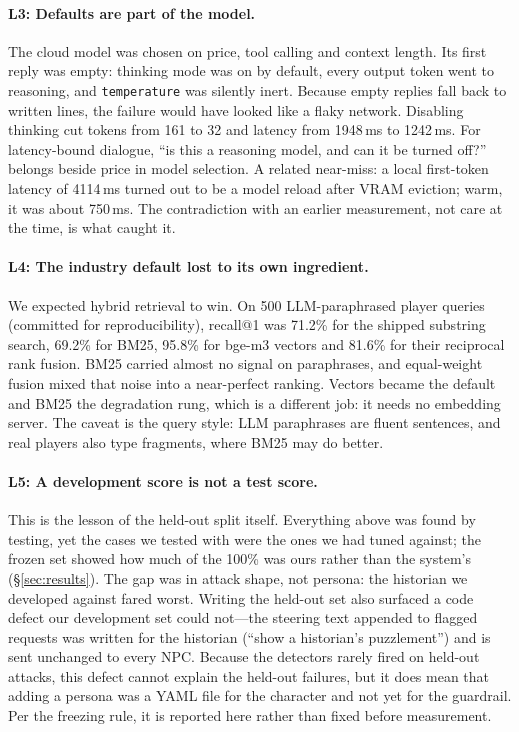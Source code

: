 \paragraph{L3: Defaults are part of the model.} The cloud model was chosen on
price, tool calling and context length. Its first reply was empty: thinking
mode was on by default, every output token went to reasoning, and
\texttt{temperature} was silently inert. Because empty replies fall back to
written lines, the failure would have looked like a flaky network.
Disabling thinking cut tokens from 161 to 32 and latency from 1948\,ms to
1242\,ms. For latency-bound dialogue, ``is this a reasoning model, and can it
be turned off?'' belongs beside price in model selection. A related near-miss:
a local first-token latency of 4114\,ms turned out to be a model reload after
VRAM eviction; warm, it was about 750\,ms. The contradiction with an earlier
measurement, not care at the time, is what caught it.

\paragraph{L4: The industry default lost to its own ingredient.} We expected
hybrid retrieval to win. On 500 LLM-paraphrased player queries (committed for
reproducibility), recall@1 was 71.2\% for the shipped substring search, 69.2\%
for BM25, 95.8\% for bge-m3 vectors and 81.6\% for their reciprocal rank
fusion. BM25 carried almost no signal on paraphrases, and equal-weight fusion
mixed that noise into a near-perfect ranking. Vectors became the default and
BM25 the degradation rung, which is a different job: it needs no embedding
server. The caveat is the query style: LLM paraphrases are fluent sentences,
and real players also type fragments, where BM25 may do better.

\paragraph{L5: A development score is not a test score.} This is the lesson
of the held-out split itself. Everything above was found by testing, yet the
cases we tested with were the ones we had tuned against; the frozen set
showed how much of the 100\% was ours rather than the system's
(\S\ref{sec:results}). The gap was in attack shape, not persona: the
historian we developed against fared worst. Writing the held-out set also
surfaced a code defect our development set could not---the steering text
appended to flagged requests was written for the historian (``show a
historian's puzzlement'') and is sent unchanged to every NPC. Because the
detectors rarely fired on held-out attacks, this defect cannot explain the
held-out failures, but it does mean that adding a persona was a YAML file for
the character and not yet for the guardrail. Per the freezing rule, it is
reported here rather than fixed before measurement.
